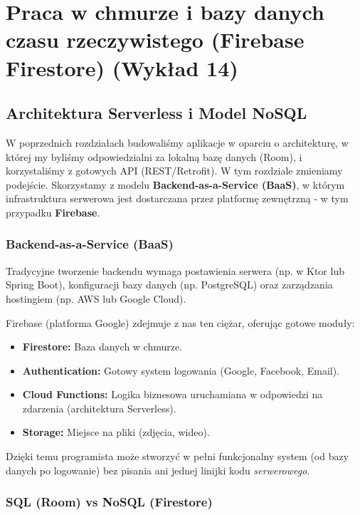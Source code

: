 \chapter{Praca w chmurze i bazy danych czasu rzeczywistego (Firebase Firestore) (Wykład 14)}

\section{Architektura Serverless i Model NoSQL}

W poprzednich rozdziałach budowaliśmy aplikacje w oparciu o architekturę, w której my byliśmy odpowiedzialni za lokalną bazę danych (Room), i korzystaliśmy z gotowych API (REST/Retrofit). W tym rozdziale zmieniamy podejście. Skorzystamy z modelu \textbf{Backend-as-a-Service (BaaS)}, w którym infrastruktura serwerowa jest dostarczana przez platformę zewnętrzną - w tym przypadku \textbf{Firebase}.

\subsection{Backend-as-a-Service (BaaS)}

Tradycyjne tworzenie backendu wymaga postawienia serwera (np. w Ktor lub Spring Boot), konfiguracji bazy danych (np. PostgreSQL) oraz zarządzania hostingiem (np. AWS lub Google Cloud).

Firebase (platforma Google) zdejmuje z nas ten ciężar, oferując gotowe moduły:
\begin{itemize}
    \item \textbf{Firestore:} Baza danych w chmurze.
    \item \textbf{Authentication:} Gotowy system logowania (Google, Facebook, Email).
    \item \textbf{Cloud Functions:} Logika biznesowa uruchamiana w odpowiedzi na zdarzenia (architektura Serverless).
    \item \textbf{Storage:} Miejsce na pliki (zdjęcia, wideo).
\end{itemize}

Dzięki temu programista może stworzyć w pełni funkcjonalny system (od bazy danych po logowanie) bez pisania ani jednej linijki kodu \textit{serwerowego}.

\subsection{SQL (Room) vs NoSQL (Firestore)}

